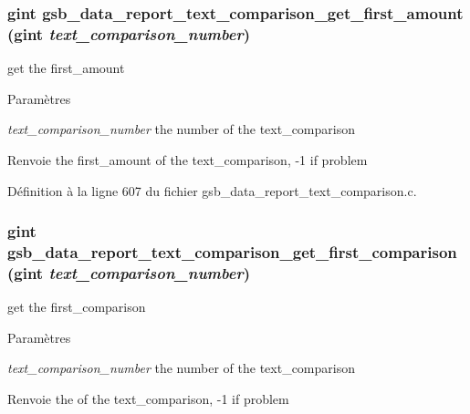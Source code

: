 \subsubsection[{gsb\_\-data\_\-report\_\-text\_\-comparison\_\-get\_\-first\_\-amount}]{\setlength{\rightskip}{0pt plus 5cm}gint gsb\_\-data\_\-report\_\-text\_\-comparison\_\-get\_\-first\_\-amount (gint {\em text\_\-comparison\_\-number})}\label{gsb__data__report__text__comparison_8c_af8a1288b302625bf680b9b1eb908af6f}
get the first\_\-amount


\begin{DoxyParams}{Paramètres}
\item[{\em text\_\-comparison\_\-number}]the number of the text\_\-comparison\end{DoxyParams}
\begin{DoxyReturn}{Renvoie}
the first\_\-amount of the text\_\-comparison, -\/1 if problem 
\end{DoxyReturn}


Définition à la ligne 607 du fichier gsb\_\-data\_\-report\_\-text\_\-comparison.c.

\subsubsection[{gsb\_\-data\_\-report\_\-text\_\-comparison\_\-get\_\-first\_\-comparison}]{\setlength{\rightskip}{0pt plus 5cm}gint gsb\_\-data\_\-report\_\-text\_\-comparison\_\-get\_\-first\_\-comparison (gint {\em text\_\-comparison\_\-number})}\label{gsb__data__report__text__comparison_8c_afe21d933d743f2a91261483b8b0b466c}
get the first\_\-comparison


\begin{DoxyParams}{Paramètres}
\item[{\em text\_\-comparison\_\-number}]the number of the text\_\-comparison\end{DoxyParams}
\begin{DoxyReturn}{Renvoie}
the of the text\_\-comparison, -\/1 if problem 
\end{DoxyReturn}


